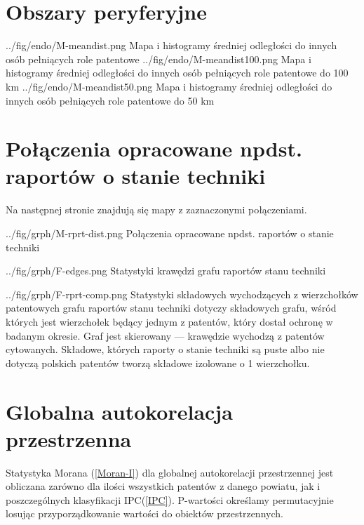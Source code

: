     \newpage\section
  {Obszary peryferyjne}

  \newpage\charttripled
{../fig/endo/M-meandist.png}
{ Mapa i histogramy średniej odległości do innych osób pełniących role patentowe }
{../fig/endo/M-meandist100.png}
{ Mapa i histogramy średniej odległości do innych osób pełniących role patentowe do 100 km }
{../fig/endo/M-meandist50.png}
{ Mapa i histogramy średniej odległości do innych osób pełniących role patentowe do 50 km }




    \newpage\section
  {Połączenia opracowane npdst. raportów o stanie techniki}

Na następnej stronie znajdują się mapy z zaznaczonymi połączeniami.

\newpage

  \chart
{../fig/grph/M-rprt-dist.png}
{ Połączenia opracowane npdst. raportów o stanie techniki }\newpage

  \chartside
{../fig/grph/F-edges.png}
{ Statystyki krawędzi grafu raportów stanu techniki }

  \chartside
{../fig/grph/F-rprt-comp.png}
{ Statystyki składowych wychodzących z wierzchołków patentowych
  grafu raportów stanu techniki }{
 dotyczy składowych grafu, wśród których
jest wierzchołek będący jednym z patentów, który dostał ochronę w badanym okresie.
Graf jest skierowany --- krawędzie wychodzą z patentów cytowanych.
Składowe, których raporty o stanie techniki są puste albo nie dotyczą 
polskich patentów tworzą składowe izolowane o 1 wierzchołku.
}



    \newpage\section
  {Globalna autokorelacja przestrzenna}

Statystyka Morana (\cref{Moran-I}) dla globalnej autokorelacji przestrzennej
jest obliczana zarówno dla ilości wszystkich patentów z danego powiatu, 
jak i poszczególnych klasyfikacji \ac{IPC}(\cref{IPC}).
P-wartości określamy permutacyjnie losując przyporządkowanie wartości
do obiektów przestrzennych\cite{pysal-07}.

